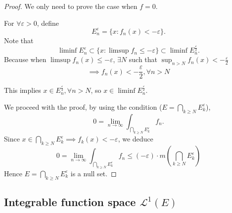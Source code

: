 \begin{proof}[Proof]
	We only need to prove the case when $f=0$.

	For  $\forall\varepsilon>0$, define
	\[
	E_n^{\varepsilon} = \{x: f_n(x)< -\varepsilon\}.
	\]
	Note that
	\[
	\liminf E_n^{\varepsilon} \subset \{x: \limsup f_n\le -\varepsilon\}
	\subset \liminf E_n^{\frac{\varepsilon}{2}}.
	\]
	Because when $\limsup f_n(x)\le -\varepsilon$,  $\exists N$ such that
	$\sup_{n>N} f_n(x) < -\frac{\varepsilon}{2}$
	\[
		\implies f_n(x)<-\frac{\varepsilon}{2}, \forall n>N
	\]

	This implies $x\in E_n^{\frac{\varepsilon}{2}}, \forall n>N$,
	so $x\in\liminf E_n^{\frac{\varepsilon}{2}}$.

	We proceed with the proof,
	by using the condition ($E = \bigcap_{k\ge N}E_k^{\varepsilon}$),
    \[
	0 = \lim_{n\to \infty} \int_{\bigcap_{k\ge N}E_k^{\varepsilon}} f_n.
	\]
	Since $x\in \bigcap_{k\ge N} E_k^{\varepsilon}\implies f_k(x)<-\varepsilon$,
	we deduce
	\[
	0 = \lim_{n\to \infty} \int_{\bigcap_{k\ge N}E_k^{\varepsilon}} f_n
	\le (-\varepsilon)\cdot m\left(\bigcap_{k\ge N}E_k^{\varepsilon}\right)
	\]
	Hence $E = \bigcap_{k\ge N}E_k^{\varepsilon}$ is a null set.
\end{proof}

\subsection{Integrable function space $\mathcal{L}^1(E)$}
\label{sub:Integrable function space L1}

